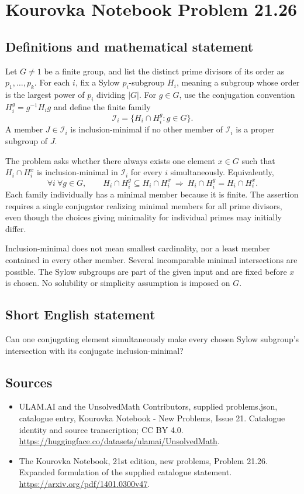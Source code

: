 \documentclass[11pt,a4paper]{article}
\begin{document}
\section*{Kourovka Notebook Problem 21.26}\label{statement}

\subsection{Definitions and mathematical statement}
Let $G\ne1$ be a finite group, and list the distinct prime divisors of
its order as $p_1,\ldots,p_k$. For each $i$, fix a Sylow $p_i$-subgroup
$H_i$, meaning a subgroup whose order is the largest power of $p_i$
dividing $|G|$. For $g\in G$, use the conjugation convention
$H_i^g=g^{-1}H_i g$ and define the finite family
\[
 \mathcal I_i=\{H_i\cap H_i^g:g\in G\}.
\]
A member $J\in\mathcal I_i$ is inclusion-minimal if no other member of
$\mathcal I_i$ is a proper subgroup of $J$.

The problem asks whether there always exists one element $x\in G$
such that $H_i\cap H_i^x$ is inclusion-minimal in $\mathcal I_i$ for
every $i$ simultaneously. Equivalently,
\[
 \forall i\ \forall g\in G,\qquad
 H_i\cap H_i^g\subseteq H_i\cap H_i^x
 \ \Longrightarrow\ H_i\cap H_i^g=H_i\cap H_i^x.
\]
Each family individually has a minimal member because it is finite.
The assertion requires a single conjugator realizing minimal members
for all prime divisors, even though the choices giving minimality for
individual primes may initially differ.

Inclusion-minimal does not mean smallest cardinality, nor a least member
contained in every other member. Several incomparable minimal intersections
are possible. The Sylow subgroups are part of the given input and are
fixed before $x$ is chosen. No solubility or simplicity assumption is
imposed on $G$.
\subsection{Short English statement}
Can one conjugating element simultaneously make every chosen Sylow subgroup’s intersection with its conjugate inclusion-minimal?
\subsection{Sources}
\begin{itemize}
\item[S1] ULAM.AI and the UnsolvedMath Contributors, supplied problems.json, catalogue entry, Kourovka Notebook - New Problems, Issue 21. Catalogue identity and source transcription; CC BY 4.0.
\url{https://huggingface.co/datasets/ulamai/UnsolvedMath}.
\item[S2] The Kourovka Notebook, 21st edition, new problems, Problem 21.26. Expanded formulation of the supplied catalogue statement.
\url{https://arxiv.org/pdf/1401.0300v47}.
\end{itemize}
\end{document}
